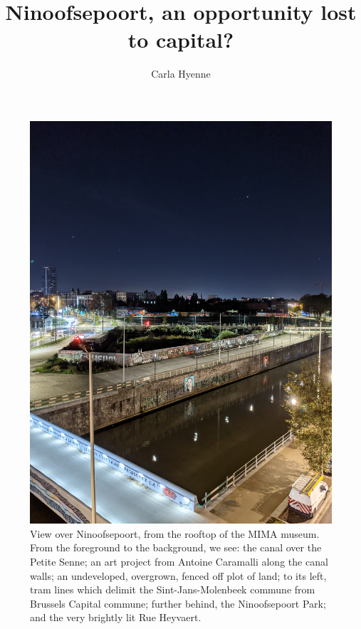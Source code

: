 \documentclass{article}[11pt]
\title{Ninoofsepoort, an opportunity lost to capital?}
\author{Carla Hyenne}
\date{}
\begin{document}
\maketitle

\begin{figure}[h!]
	\centering
	\captionsetup{labelformat=empty}
	\includegraphics[width=\textwidth, angle=-90]{bxl_canal_far}
	\caption{View over Ninoofsepoort, from the rooftop of the MIMA museum. From the foreground to the background, we see: the canal over the Petite Senne; an art project from Antoine Caramalli along the canal walls; an undeveloped, overgrown, fenced off plot of land; to its left, tram lines which delimit the Sint-Jans-Molenbeek commune from Brussels Capital commune; further behind, the Ninoofsepoort Park; and the very brightly lit Rue Heyvaert.}
\end{figure}

\pagebreak
\end{document}
